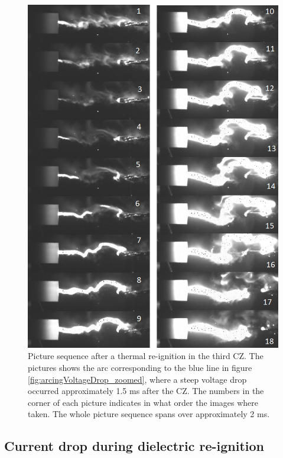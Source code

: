 \documentclass[10pt,b5paper,twoside]{article}
\begin{document}
\begin{figure}[H]
\centering
\includegraphics[scale=0.67, angle =0 ]{Bilder/Results/301_23_TR_TR_drop.png}
\caption{Picture sequence after a thermal re-ignition in the third CZ. The pictures shows the arc corresponding to the blue line in figure \ref{fig:arcingVoltageDrop_zoomed}, where a steep voltage drop occurred approximately 1.5 ms after the CZ. The numbers in the corner of each picture indicates in what order the images where taken. The whole picture sequence spans over approximately 2 ms.} \label{fig:arcingVoltage_drop_301_blue}
\end{figure}

\newpage
\subsection{Current drop during dielectric re-ignition} \label{sec:dielectricReIgnitionResults}
\end{document}
